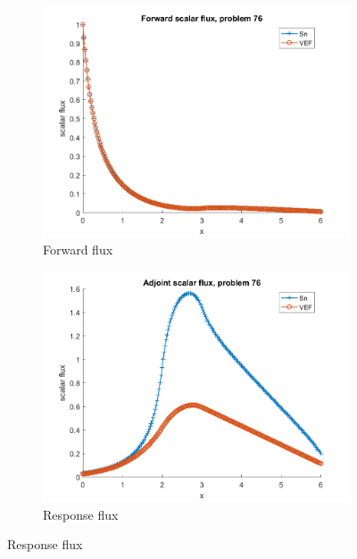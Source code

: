 \documentclass{article}
\begin{document}
\begin{figure}[H]
\label{Case76Flux}
\centering
\begin{subfigure}{.5\textwidth}
  \centering
  \includegraphics[width=.98\linewidth]{IanProposal/figures2/76phi.png}
  \caption{Forward flux}
  \label{fig:sfig1}
\end{subfigure}%
\begin{subfigure}{.5\textwidth}
  \centering
  \includegraphics[width=.98\linewidth]{IanProposal/figures2/76phia.png}
  \caption{Response flux}
  \label{fig:sfig4}
\end{subfigure}%
\end{figure}
\end{document}
